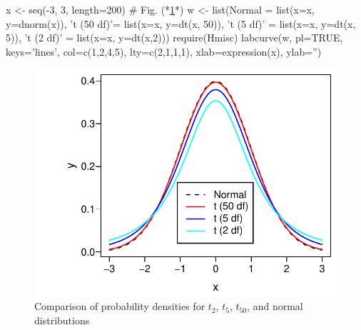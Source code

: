 \begin{Schunk}
\begin{Sinput}
x <- seq(-3, 3, length=200)   # Fig. (*\ref{fig:htest-tpdfs}*)
w <- list(Normal     = list(x=x, y=dnorm(x)),
          't (50 df)'= list(x=x, y=dt(x, 50)),
          't (5 df)' = list(x=x, y=dt(x, 5)),
          't (2 df)' = list(x=x, y=dt(x,2)))
require(Hmisc)
labcurve(w, pl=TRUE, keys='lines', col=c(1,2,4,5), lty=c(2,1,1,1),
         xlab=expression(x), ylab='')
\end{Sinput}
\begin{figure}[htbp]

\centerline{\includegraphics[width=\maxwidth]{htest-tpdfs-1} }

\caption[$t$ distribution for varying d.f.]{Comparison of probability densities for $t_2$, $t_5$, $t_{50}$, and normal distributions}\label{fig:htest-tpdfs}
\end{figure}
\end{Schunk}

